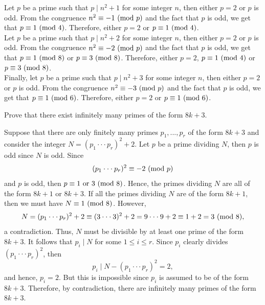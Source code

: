 \begin{solution}
    Let $p$ be a prime such that $p \mid n^2 + 1$ for some integer $n$, then either $p = 2$ or $p$ is odd. From the congruence $n^2 \equiv -1 \ (\mathrm{mod}\ p)$ and the fact that $p$ is odd, we get that $p \equiv 1 \ (\mathrm{mod}\ 4)$. Therefore, either $p = 2$ or $p \equiv 1 \ (\mathrm{mod}\ 4)$.\\
    
    Let $p$ be a prime such that $p \mid n^2 + 2$ for some integer $n$, then either $p = 2$ or $p$ is odd. From the congruence $n^2 \equiv -2 \ (\mathrm{mod}\ p)$ and the fact that $p$ is odd, we get that $p \equiv 1 \ (\mathrm{mod}\ 8)$ or $p \equiv 3 \ (\mathrm{mod}\ 8)$. Therefore, either $p = 2$, $p \equiv 1 \ (\mathrm{mod}\ 4)$ or $p \equiv 3 \ (\mathrm{mod}\ 8)$.\\
    
    Finally, let $p$ be a prime such that $p \mid n^2 + 3$ for some integer $n$, then either $p = 2$ or $p$ is odd. From the congruence $n^2 \equiv -3 \ (\mathrm{mod}\ p)$ and the fact that $p$ is odd, we get that $p \equiv 1 \ (\mathrm{mod}\ 6)$. Therefore, either $p = 2$ or $p \equiv 1 \ (\mathrm{mod}\ 6)$.\\
\end{solution}

\begin{exercise}
    Prove that there exist infinitely many primes of the form $8k+3$.  \\
\end{exercise}

\begin{solution}
    Suppose that there are only finitely many primes $p_1, ..., p_r$ of the form $8k+3$ and consider the integer $N = (p_1 \cdot \cdot \cdot p_r)^2 + 2$. Let $p$ be a prime dividing $N$, then $p$ is odd since $N$ is odd. Since
    $$(p_1 \cdot \cdot \cdot p_r)^2 \equiv -2 \ (\mathrm{mod}\ p)$$
    and $p$ is odd, then $p \equiv 1 \text{ or } 3 \ (\mathrm{mod}\ 8)$. Hence, the primes dividing $N$ are all of the form $8k+1$ or $8k+3$. If all the primes dividing $N$ are of the form $8k+1$, then we must have $N \equiv 1 \ (\mathrm{mod}\ 8)$. However,
    $$N = (p_1\cdot \cdot \cdot p_r)^2 + 2 \equiv (3 \cdot \cdot \cdot 3)^2 + 2 = 9\cdot \cdot \cdot 9 + 2 \equiv 1 + 2 = 3 \ (\mathrm{mod}\ 8),$$
    a contradiction. Thus, $N$ must be divisible by at least one prime of the form $8k+3$. It follows that $p_i \mid N$ for some $1 \leq i \leq r$. Since $p_i$ clearly divides $(p_1 \cdot \cdot \cdot p_r)^2$, then 
    $$p_i \mid N - (p_1 \cdot \cdot \cdot p_r)^2 = 2,$$
    and hence, $p_i = 2$. But this is impossible since $p_i$ is assumed to be of the form $8k+3$. Therefore, by contradiction, there are infinitely many primes of the form $8k+3$. \\
\end{solution}

